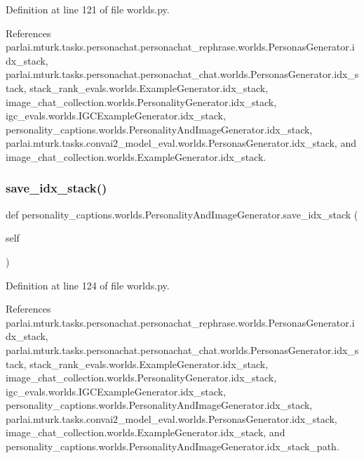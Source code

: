 Definition at line 121 of file worlds.\+py.



References parlai.\+mturk.\+tasks.\+personachat.\+personachat\+\_\+rephrase.\+worlds.\+Personas\+Generator.\+idx\+\_\+stack, parlai.\+mturk.\+tasks.\+personachat.\+personachat\+\_\+chat.\+worlds.\+Personas\+Generator.\+idx\+\_\+stack, stack\+\_\+rank\+\_\+evals.\+worlds.\+Example\+Generator.\+idx\+\_\+stack, image\+\_\+chat\+\_\+collection.\+worlds.\+Personality\+Generator.\+idx\+\_\+stack, igc\+\_\+evals.\+worlds.\+I\+G\+C\+Example\+Generator.\+idx\+\_\+stack, personality\+\_\+captions.\+worlds.\+Personality\+And\+Image\+Generator.\+idx\+\_\+stack, parlai.\+mturk.\+tasks.\+convai2\+\_\+model\+\_\+eval.\+worlds.\+Personas\+Generator.\+idx\+\_\+stack, and image\+\_\+chat\+\_\+collection.\+worlds.\+Example\+Generator.\+idx\+\_\+stack.

\mbox{\label{classpersonality__captions_1_1worlds_1_1PersonalityAndImageGenerator_af76fb5f34ce3555d6e56edf5ad8de390}} 
\subsubsection{\texorpdfstring{save\+\_\+idx\+\_\+stack()}{save\_idx\_stack()}}
{\footnotesize\ttfamily def personality\+\_\+captions.\+worlds.\+Personality\+And\+Image\+Generator.\+save\+\_\+idx\+\_\+stack (\begin{DoxyParamCaption}\item[{}]{self }\end{DoxyParamCaption})}



Definition at line 124 of file worlds.\+py.



References parlai.\+mturk.\+tasks.\+personachat.\+personachat\+\_\+rephrase.\+worlds.\+Personas\+Generator.\+idx\+\_\+stack, parlai.\+mturk.\+tasks.\+personachat.\+personachat\+\_\+chat.\+worlds.\+Personas\+Generator.\+idx\+\_\+stack, stack\+\_\+rank\+\_\+evals.\+worlds.\+Example\+Generator.\+idx\+\_\+stack, image\+\_\+chat\+\_\+collection.\+worlds.\+Personality\+Generator.\+idx\+\_\+stack, igc\+\_\+evals.\+worlds.\+I\+G\+C\+Example\+Generator.\+idx\+\_\+stack, personality\+\_\+captions.\+worlds.\+Personality\+And\+Image\+Generator.\+idx\+\_\+stack, parlai.\+mturk.\+tasks.\+convai2\+\_\+model\+\_\+eval.\+worlds.\+Personas\+Generator.\+idx\+\_\+stack, image\+\_\+chat\+\_\+collection.\+worlds.\+Example\+Generator.\+idx\+\_\+stack, and personality\+\_\+captions.\+worlds.\+Personality\+And\+Image\+Generator.\+idx\+\_\+stack\+\_\+path.



